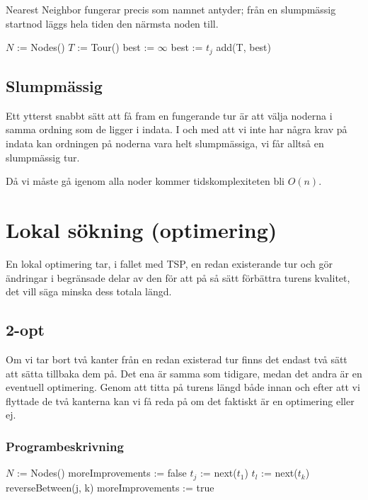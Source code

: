 \documentclass[a4paper,12pt]{article}
\renewcommand{\*}{\ensuremath{\cdot}}
\begin{document}
Nearest Neighbor fungerar precis som namnet antyder; från en slumpmässig
startnod läggs hela tiden den närmsta noden till.

\begin{algorithmic}
    \STATE $N$ := Nodes()
    \STATE $T$ := Tour()
        \STATE best := $\infty$
                \STATE best := $t_j$
                \STATE add(T, best)
            \ENDIF
        \ENDFOR
    \ENDFOR
\end{algorithmic}

\subsection{Slumpmässig}

Ett ytterst snabbt sätt att få fram en fungerande tur är att välja noderna i 
samma ordning som de ligger i indata. I och med att vi inte har några krav på
indata kan ordningen på noderna vara helt slumpmässiga, vi får alltså en 
slumpmässig tur.

Då vi måste gå igenom alla noder kommer tidskomplexiteten bli $O(n)$.


\section{Lokal sökning (optimering)} 

En lokal optimering tar, i fallet med TSP, en redan existerande tur och gör
ändringar i begränsade delar av den för att på så sätt förbättra turens
kvalitet, det vill säga minska dess totala längd.

\subsection{2-opt} 

Om vi tar bort två kanter från en redan existerad tur finns det endast två sätt
att sätta tillbaka dem på. Det ena är samma som tidigare, medan det andra är en
eventuell optimering. Genom att titta på turens längd både innan och efter att
vi flyttade de två kanterna kan vi få reda på om det faktiskt är en optimering
eller ej.
 
\subsubsection{Programbeskrivning}

\begin{algorithmic}
    \STATE $N$ := Nodes()
        \STATE moreImprovements := false
            \STATE $t_j$ := next($t_1$)
                \STATE $t_l$ := next($t_k$)
                    \STATE reverseBetween(j, k)
                    \STATE moreImprovements := true
                \ENDIF
            \ENDFOR
        \ENDFOR
    \ENDWHILE   
\end{algorithmic}
           
\end{document}
